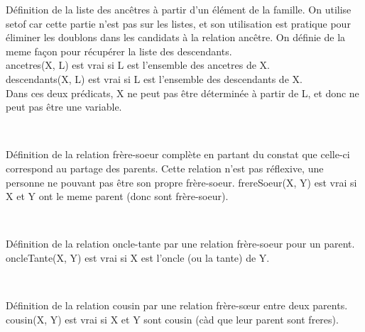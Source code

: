 \documentclass[a4paper, 11pt]{article}
\newenvironment{DDbox}[1]{
\begin{lrbox}{\BBbox}\begin{minipage}{\linewidth}}
{\end{minipage}\end{lrbox}\noindent\colorbox{Zgris}{\usebox{\BBbox}} \\
[.5cm]}
\begin{document}
Définition de la liste des ancêtres à partir d'un élément de la
famille.  On utilise setof car cette partie n'est pas sur les
listes, et son utilisation est pratique pour éliminer les
doublons dans les candidats à la relation ancêtre. On définie de
la meme façon pour récupérer la liste des descendants. \\
ancetres(X, L) est vrai si L est l'ensemble des ancetres de X. \\
descendants(X, L) est vrai si L est l'ensemble des descendants de X. \\
Dans ces deux prédicats, X ne peut pas être déterminée à partir
de L, et donc ne peut pas être une variable. \\
\begin{DDbox}{\linewidth}
    
\end{DDbox}

Définition de la relation frère-soeur complète en partant du
constat que celle-ci correspond au partage des parents. Cette
relation n'est pas réflexive, une personne ne pouvant pas être
son propre frère-soeur. frereSoeur(X, Y) est vrai si X et Y ont
le meme parent (donc sont frère-soeur). \\
\begin{DDbox}{\linewidth}
    
\end{DDbox}

Définition de la relation oncle-tante par une relation
frère-soeur pour un parent. oncleTante(X, Y) est vrai si X est
l'oncle (ou la tante) de Y. \\
\begin{DDbox}{\linewidth}
    
\end{DDbox}

Définition de la relation cousin par une relation frère-sœur
entre deux parents.  cousin(X, Y) est vrai si X et Y sont cousin
(càd que leur parent sont freres). \\
\begin{DDbox}{\linewidth}
    
\end{DDbox}

%     
\end{document}
